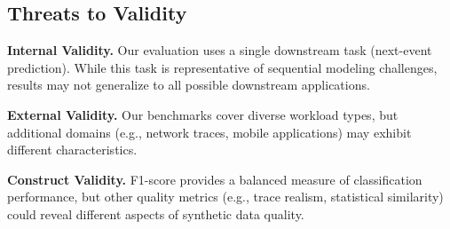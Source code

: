 \subsection{Threats to Validity}
\label{subsec:threats}

\textbf{Internal Validity.} Our evaluation uses a single downstream task (next-event prediction). While this task is representative of sequential modeling challenges, results may not generalize to all possible downstream applications.

\textbf{External Validity.} Our benchmarks cover diverse workload types, but additional domains (e.g., network traces, mobile applications) may exhibit different characteristics.

\textbf{Construct Validity.} F1-score provides a balanced measure of classification performance, but other quality metrics (e.g., trace realism, statistical similarity) could reveal different aspects of synthetic data quality.
